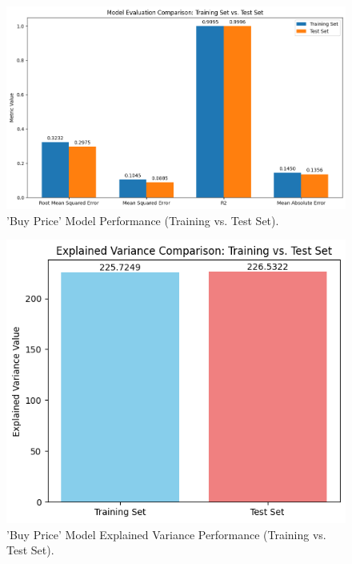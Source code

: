 \begin{figure}[H]
    \centering
    \includegraphics[width=\linewidth]{images/buy_rmse_mse_r2_mae}
    \caption{'Buy Price' Model Performance (Training vs. Test Set).}
    \label{fig:buy_rmse_mse_r2_mae}
\end{figure}

\begin{figure}[H]
    \centering
    \includegraphics[width=0.8\linewidth]{images/buy_var}
    \caption{'Buy Price' Model Explained Variance Performance (Training vs. Test Set).}
    \label{fig:buy_var}
\end{figure}